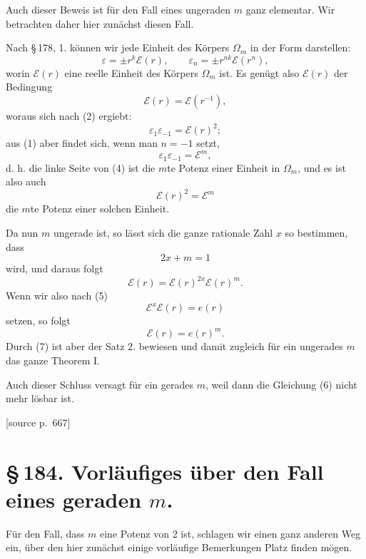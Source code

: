 \documentclass[11pt]{article}
\newcommand{\srcpage}[1]{\par\medskip\noindent\textsf{[source p.~#1]}\par\smallskip}
\begin{document}
Auch dieser Beweis ist für den Fall eines ungeraden $m$ ganz elementar. Wir betrachten daher hier zunächst diesen Fall.

Nach \S\,178, 1. können wir jede Einheit des Körpers $\Omega_m$ in der Form darstellen:
\begin{equation}
\varepsilon=\pm r^k\mathscr E(r),\qquad
\varepsilon_n=\pm r^{nk}\mathscr E(r^n),
\tag{2}
\end{equation}
worin $\mathscr E(r)$ eine reelle Einheit des Körpers $\Omega_m$ ist. Es genügt also $\mathscr E(r)$ der Bedingung
\begin{equation}
\mathscr E(r)=\mathscr E(r^{-1}),
\tag{3}
\end{equation}
woraus sich nach (2) ergiebt:
\begin{equation}
\varepsilon_1\varepsilon_{-1}=\mathscr E(r)^2;
\tag{4}
\end{equation}
aus (1) aber findet sich, wenn man $n=-1$ setzt,
\[
\varepsilon_1\varepsilon_{-1}=\mathscr E^m,
\]
d. h. die linke Seite von (4) ist die $m$te Potenz einer Einheit in $\Omega_m$, und es ist also auch
\begin{equation}
\mathscr E(r)^2=\mathscr E^m
\tag{5}
\end{equation}
die $m$te Potenz einer solchen Einheit.

Da nun $m$ ungerade ist, so lässt sich die ganze rationale Zahl $x$ so bestimmen, dass
\begin{equation}
2x+m=1
\tag{6}
\end{equation}
wird, und daraus folgt
\[
\mathscr E(r)=\mathscr E(r)^{2x}\mathscr E(r)^m.
\]
Wenn wir also nach (5)
\[
\mathscr E^x\mathscr E(r)=e(r)
\]
setzen, so folgt
\begin{equation}
\mathscr E(r)=e(r)^m.
\tag{7}
\end{equation}
Durch (7) ist aber der Satz 2. bewiesen und damit zugleich für ein ungerades $m$ das ganze Theorem I.

Auch dieser Schluss versagt für ein gerades $m$, weil dann die Gleichung (6) nicht mehr lösbar ist.

\srcpage{667}
\section*{\S\,184. Vorläufiges über den Fall eines geraden $m$.}

Für den Fall, dass $m$ eine Potenz von 2 ist, schlagen wir einen ganz anderen Weg ein, über den hier zunächst einige vorläufige Bemerkungen Platz finden mögen.
\end{document}
